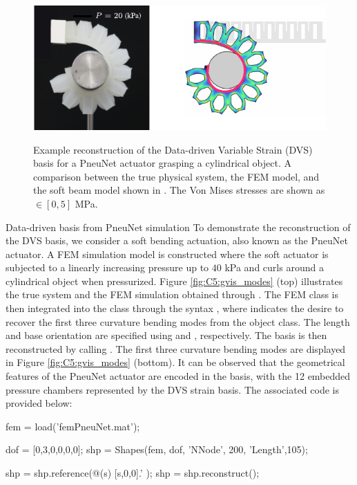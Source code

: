 \begin{figure}[!t]
\centering
\includegraphics*[width=.85\textwidth]{./pdf/thesis-figure-6-11-1.pdf} \\[0.15em]
% 
\caption{\small Example reconstruction of the Data-driven Variable Strain (DVS) basis for a PneuNet actuator grasping a cylindrical object. A comparison between the true physical system, the FEM model, and the soft beam model shown in . The Von Mises stresses are shown as \protect{}$\!\!\in [0,5]$ \si{\mega \pascal}.}
\vspace{-6mm}
\label{fig:C5:gvis_experiment}
\end{figure}
%
\begin{example}{Data-driven basis from PneuNet simulation}
To demonstrate the reconstruction of the DVS basis, we consider a soft bending actuation, also known as the PneuNet actuator. A FEM simulation model is constructed where the soft actuator is subjected to a linearly increasing pressure up to $40$ \si{\kilo \pascal} and curls around a cylindrical object when pressurized. Figure \ref{fig:C5:gvis_modes} (top) illustrates the true system and the FEM simulation obtained through . The FEM class is then integrated into the  class through the syntax , where  indicates the desire to recover the first three curvature bending modes from the  object class. The length and base orientation are specified using  and , respectively. The basis is then reconstructed by calling . The first three curvature bending modes are displayed in Figure \ref{fig:C5:gvis_modes} (bottom). It can be observed that the geometrical features of the PneuNet actuator are encoded in the basis, with the 12 embedded pressure chambers represented by the DVS strain basis. The associated code is provided below:
\end{example}
%
\begin{matlabcode}
fem = load('femPneuNet.mat');   %

dof = [0,3,0,0,0,0];  %
shp = Shapes(fem, dof, 'NNode', 200, 'Length',105);

shp = shp.reference(@(s) [s,0,0].' );
shp = shp.reconstruct();
\end{matlabcode} 
% 
\\

